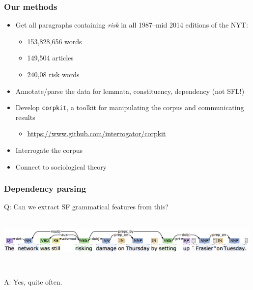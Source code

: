 \documentclass{beamer}       %
\begin{document}
\begin{frame}
    \frametitle{Our methods}
    
    \begin{itemize}
    \item Get all paragraphs containing \emph{risk} in all 1987--mid 2014 editions of the NYT:
    \begin{itemize}
    \item 153,828,656 words
    \item 149,504 articles
    \item 240,08 risk words
    \end{itemize}
    \item Annotate\slash parse the data for lemmata, constituency, dependency (not SFL!)
    \item Develop \texttt{corpkit}, a toolkit for manipulating the corpus and communicating results
    \begin{itemize}
        \item \url{https://www.github.com/interrogator/corpkit}
    \end{itemize}
    \item Interrogate the corpus
    \item Connect to sociological theory
    \end{itemize}
\end{frame}


\begin{frame}
    \frametitle{Dependency parsing}

    Q: Can we extract SF grammatical features from this? 

    ~\\

    \centering
    \includegraphics[width=0.99\textwidth]{../images/depparse}

    ~\\
    
    \raggedright
    A: Yes, quite often.
\end{frame}
\end{document}
